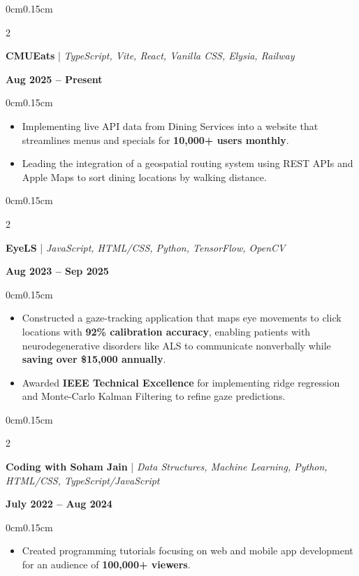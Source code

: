 \documentclass[10pt, letterpaper]{article}
\newenvironment{highlights}{
    \begin{itemize}[topsep=0pt, parsep=0pt, partopsep=0pt, itemsep=0pt, leftmargin=0.6cm]
}{
    \end{itemize}
}
\newenvironment{onecolentry}{
    \begin{adjustwidth}{0cm}{0.15cm}
}{
    \end{adjustwidth}
}
\newenvironment{twocolentry}[2][]{
    \onecolentry
    \def\secondColumn{#2}
    \setcolumnwidth{\fill, 4cm}
    \begin{paracol}{2}
}{
    \switchcolumn \raggedleft \secondColumn
    \end{paracol}
    \endonecolentry
}
\begin{document}
    \vspace{0.05cm}

    \begin{twocolentry}{\textbf{Aug 2025 -- Present}}
        \textbf{CMUEats} | \textit{TypeScript, Vite, React, Vanilla CSS, Elysia, Railway}
    \end{twocolentry}
    \vspace{-0.05cm}
    \begin{onecolentry}
        \begin{highlights}
            \item Implementing live API data from Dining Services into a website that streamlines menus and specials for \textbf{10,000+ users monthly}.
            \item Leading the integration of a geospatial routing system using REST APIs and Apple Maps to sort dining locations by walking distance.
        \end{highlights}
    \end{onecolentry}

    \vspace{0.05cm}
    
    \begin{twocolentry}{\textbf{Aug 2023 -- Sep 2025}}
        \textbf{EyeLS} | \textit{JavaScript, HTML/CSS, Python, TensorFlow, OpenCV}
    \end{twocolentry}
    \vspace{-0.05cm}
    \begin{onecolentry}
        \begin{highlights}
            \item Constructed a gaze-tracking application that maps eye movements to click locations with \textbf{92\% calibration accuracy}, enabling patients with neurodegenerative disorders like ALS to communicate nonverbally while \textbf{saving over \$15,000 annually}.
            \item Awarded \textbf{IEEE Technical Excellence} for implementing ridge regression and Monte-Carlo Kalman Filtering to refine gaze predictions.
        \end{highlights}
    \end{onecolentry}

    \vspace{0.05cm}
    
    \begin{twocolentry}{\textbf{July 2022 -- Aug 2024}}
        \textbf{Coding with Soham Jain} | \textit{Data Structures, Machine Learning, Python, HTML/CSS, TypeScript/JavaScript}
    \end{twocolentry}
    \vspace{-0.05cm}
    \begin{onecolentry}
        \begin{highlights}
            \item Created programming tutorials focusing on web and mobile app development for an audience of \textbf{100,000+ viewers}.
        \end{highlights}
    \end{onecolentry}
\end{document}
